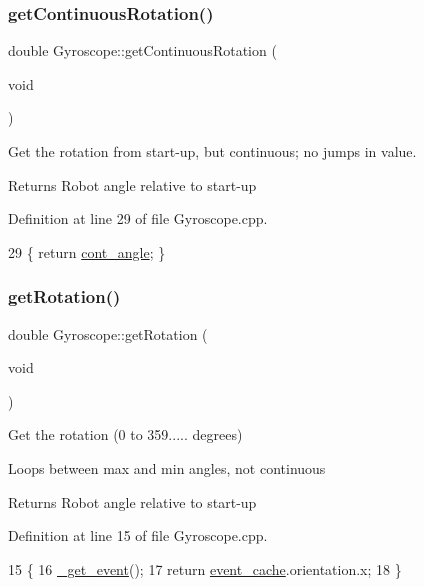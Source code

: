 \subsubsection{\texorpdfstring{get\+Continuous\+Rotation()}{getContinuousRotation()}}
{\footnotesize\ttfamily double Gyroscope\+::get\+Continuous\+Rotation (\begin{DoxyParamCaption}\item[{void}]{ }\end{DoxyParamCaption})}



Get the rotation from start-\/up, but continuous; no jumps in value. 

\begin{DoxyReturn}{Returns}
Robot angle relative to start-\/up 
\end{DoxyReturn}


Definition at line 29 of file Gyroscope.\+cpp.


\begin{DoxyCode}
29 \{ \textcolor{keywordflow}{return} \hyperlink{class_gyroscope_a1ed017e1e0767f70dfda902b858e04bc}{cont\_angle}; \}
\end{DoxyCode}
\mbox{\label{class_gyroscope_a3dc93cb932fd98ce7e129100680887d5}} 
\subsubsection{\texorpdfstring{get\+Rotation()}{getRotation()}}
{\footnotesize\ttfamily double Gyroscope\+::get\+Rotation (\begin{DoxyParamCaption}\item[{void}]{ }\end{DoxyParamCaption})}



Get the rotation (0 to 359..... degrees) 

Loops between max and min angles, not continuous \begin{DoxyReturn}{Returns}
Robot angle relative to start-\/up 
\end{DoxyReturn}


Definition at line 15 of file Gyroscope.\+cpp.


\begin{DoxyCode}
15                                   \{
16     \hyperlink{class_gyroscope_abd15bf5d98f1d4b6ee3aff051812972e}{\_get\_event}();
17     \textcolor{keywordflow}{return} \hyperlink{class_gyroscope_a6c8b9e319b379c2f1582afbe25e68c76}{event\_cache}.orientation.x;
18 \}
\end{DoxyCode}
\mbox{\label{class_gyroscope_a121afa879781ade47d27903f3d5d31e5}} 
